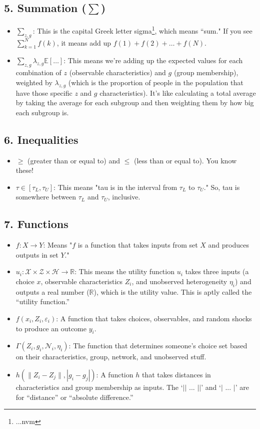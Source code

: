 \documentclass{article}
\newcommand{\E}{\mathbb{E}}
\newcommand{\R}{\mathbb{R}}
\newcommand{\X}{\mathcal{X}}
\begin{document}
\subsection*{5. Summation ($\sum$)}
\begin{itemize}
    \item $\sum_{z,g}$: This is the capital Greek letter sigma\footnote{...nvm}, which means ``sum." If you see $\sum_{k=1}^N f(k)$, it means add up $f(1) + f(2) + \ldots + f(N)$.

    \item $\sum_{z,g} \lambda_{z,g} \E[\ldots]$: This means we're adding up the expected values for each combination of $z$ (observable characteristics) and $g$ (group membership), weighted by $\lambda_{z,g}$ (which is the proportion of people in the population that have those specific $z$ and $g$ characteristics). It's like calculating a total average by taking the average for each subgroup and then weighting them by how big each subgroup is.
\end{itemize}

\subsection*{6. Inequalities}
\begin{itemize}
    \item $\geq$ (greater than or equal to) and $\leq$ (less than or equal to). You know these!
    \item $\tau \in [\tau_L, \tau_U]$: This means "tau is in the interval from $\tau_L$ to $\tau_U$." So, tau is somewhere between $\tau_L$ and $\tau_U$, inclusive.
\end{itemize}

\subsection*{7. Functions}
\begin{itemize}
    \item $f: X \to Y$: Means "$f$ is a function that takes inputs from set $X$ and produces outputs in set $Y$."
    \item $u_i: \X \times \mathcal{Z} \times \mathcal{H} \to \R$: This means the utility function $u_i$ takes three inputs (a choice $x$, observable characteristics $Z_i$, and unobserved heterogeneity $\eta_i$) and outputs a real number ($\R$), which is the utility value. This is aptly called the ``utility function.''
    \item $f(x_i, Z_i, \varepsilon_i)$: A function that takes choices, observables, and random shocks to produce an outcome $y_i$.
    \item $\Gamma(Z_i, g_i, \mathcal{N}_i, \eta_i)$: The function that determines someone's choice set based on their characteristics, group, network, and unobserved stuff.
    \item $h(\|Z_i - Z_j\|, |g_i - g_j|)$: A function $h$ that takes distances in characteristics and group membership as inputs. The `$||$ ... $||$' and `$|$ ... $|$' are for ``distance'' or ``absolute difference.''
\end{itemize}
\end{document}
